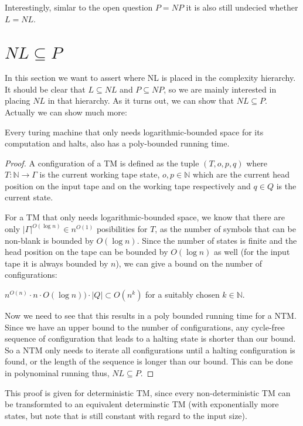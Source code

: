 Interestingly, simlar to the open question $P = NP$ it is also still
undecied whether $L = NL$.

\section{$NL \subseteq P$}\label{nl-subseteq-p}

In this section we want to assert where NL is placed in the complexity
hierarchy. It should be clear that $L \subseteq NL$ and
$P \subseteq NP$, so we are mainly interested in placing $NL$ in that
hierarchy. As it turns out, we can show that $NL \subseteq P$. Actually
we can show much more:

\begin{thm}
\label{poly-running-time}
Every turing machine that only needs logarithmic-bounded space for its computation and halts, also has a poly-bounded running time.
\end{thm}

\begin{proof}
A configuration of a TM is defined as the tuple $(T, o, p, q)$ where $T: \mathbb{N} \longrightarrow \Gamma$ is the current working tape state,
$o, p \in \mathbb{N}$ which are the current head position on the input tape and on the working tape respectively and $q \in Q$ is the current state.

For a TM that only needs logarithmic-bounded space, we know that there are only $|\Gamma|^{O(\log n)} \in n^{O(1)}$ posibilities for $T$,
as the number of symbols that can be non-blank is bounded by $O(\log n)$. Since the number of states is finite and the head position on the tape
can be bounded by $O(\log n)$ as well (for the input tape it is always bounded by $n$), we can give a bound on the number of configurations:

$n^{O(n)} \cdot n \cdot O(\log n)) \cdot |Q| \subset O(n^k)$ for a suitably chosen $k \in \mathbb{N}$.

Now we need to see that this results in a poly bounded running time for a NTM.
Since we have an upper bound to the number of configurations, any cycle-free sequence of configuration that leads to a halting state
is shorter than our bound. So a NTM only needs to iterate all configurations until a halting configuration is found, or
the length of the sequence is longer than our bound.
This can be done in polynominal running thus, $NL \subseteq P$.

\end{proof}

This proof is given for deterministic TM, since every non-deterministic
TM can be transformted to an equivalent determinstic TM (with
exponentially more states, but note that is still constant with regard
to the input size).


